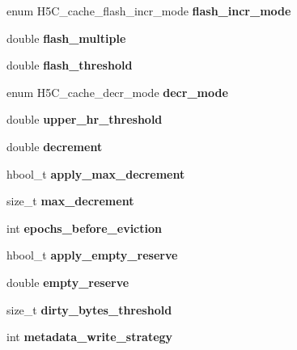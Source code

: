 \begin{DoxyCompactItemize}
enum H5\+C\+\_\+cache\+\_\+flash\+\_\+incr\+\_\+mode {\bfseries flash\+\_\+incr\+\_\+mode}
\item 
\mbox{\label{struct_h5_a_c__cache__config__t_a8e056f416183fe7c25eeb583fc2e6a87}} 
double {\bfseries flash\+\_\+multiple}
\item 
\mbox{\label{struct_h5_a_c__cache__config__t_a41131061096fc06274f024d715349881}} 
double {\bfseries flash\+\_\+threshold}
\item 
\mbox{\label{struct_h5_a_c__cache__config__t_ad3eda3ff65f82ad607ef72edec3f3332}} 
enum H5\+C\+\_\+cache\+\_\+decr\+\_\+mode {\bfseries decr\+\_\+mode}
\item 
\mbox{\label{struct_h5_a_c__cache__config__t_acbdeb5fe6e93f7ff4c0c941546777911}} 
double {\bfseries upper\+\_\+hr\+\_\+threshold}
\item 
\mbox{\label{struct_h5_a_c__cache__config__t_a4607a9385b3960ef6afe922e38095a5d}} 
double {\bfseries decrement}
\item 
\mbox{\label{struct_h5_a_c__cache__config__t_a9b439e842becf39485ee43e22e68e395}} 
hbool\+\_\+t {\bfseries apply\+\_\+max\+\_\+decrement}
\item 
\mbox{\label{struct_h5_a_c__cache__config__t_a69ab61ff6ec6948271d24ffdffe20694}} 
size\+\_\+t {\bfseries max\+\_\+decrement}
\item 
\mbox{\label{struct_h5_a_c__cache__config__t_a951b12acdb18d974ad3a0b863799f1a7}} 
int {\bfseries epochs\+\_\+before\+\_\+eviction}
\item 
\mbox{\label{struct_h5_a_c__cache__config__t_a3321e889f849c7ec7aaf1c598dfbf861}} 
hbool\+\_\+t {\bfseries apply\+\_\+empty\+\_\+reserve}
\item 
\mbox{\label{struct_h5_a_c__cache__config__t_a30de1aa6edeef8ec7950d173e14d5764}} 
double {\bfseries empty\+\_\+reserve}
\item 
\mbox{\label{struct_h5_a_c__cache__config__t_aeb667cc8ce9a09a7830631dff3557ea5}} 
size\+\_\+t {\bfseries dirty\+\_\+bytes\+\_\+threshold}
\item 
\mbox{\label{struct_h5_a_c__cache__config__t_a31d6f8f41683ac13f363852d3a10a10b}} 
int {\bfseries metadata\+\_\+write\+\_\+strategy}
\end{DoxyCompactItemize}


